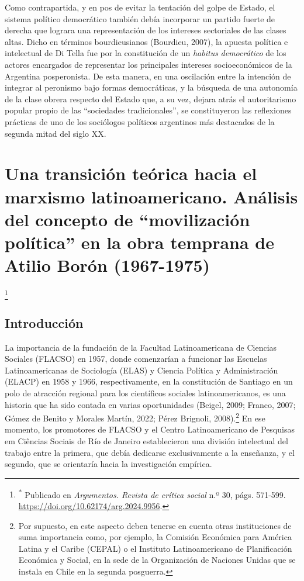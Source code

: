 Como contrapartida, y en pos de evitar la tentación del golpe de Estado, el sistema político democrático también debía incorporar un partido fuerte de derecha que lograra una representación de los intereses sectoriales de las clases altas. Dicho en términos bourdieusianos (Bourdieu, 2007), la apuesta política e intelectual de Di Tella fue por la constitución de un \emph{habitus} \emph{democrático} de los actores encargados de representar los principales intereses socioeconómicos de la Argentina posperonista. De esta manera, en una oscilación entre la intención de integrar al peronismo bajo formas democráticas, y la búsqueda de una autonomía de la clase obrera respecto del Estado que, a su vez, dejara atrás el autoritarismo popular propio de las ``sociedades tradicionales'', se constituyeron las reflexiones prácticas de uno de los sociólogos políticos argentinos más destacados de la segunda mitad del siglo XX.

\chapter{Una transición teórica hacia el marxismo latinoamericano. Análisis del concepto de ``movilización política'' en la obra temprana de Atilio Borón (1967-1975)}

\footnote{\textsuperscript{*} Publicado en \emph{Argumentos. Revista de crítica social} n.º 30, págs. 571-599. \url{https://doi.org/10.62174/arg.2024.9956}.}

\section{Introducción}

La importancia de la fundación de la Facultad Latinoamericana de Ciencias Sociales (FLACSO) en 1957, donde comenzarían a funcionar las Escuelas Latinoamericanas de Sociología (ELAS) y Ciencia Política y Administración (ELACP) en 1958 y 1966, respectivamente, en la constitución de Santiago en un polo de atracción regional para los científicos sociales latinoamericanos, es una historia que ha sido contada en varias oportunidades (Beigel, 2009; Franco, 2007; Gómez de Benito y Morales Martín, 2022; Pérez Brignoli, 2008).\footnote{Por supuesto, en este aspecto deben tenerse en cuenta otras instituciones de suma importancia como, por ejemplo, la Comisión Económica para América Latina y el Caribe (CEPAL) o el Instituto Latinoamericano de Planificación Económica y Social, en la sede de la Organización de Naciones Unidas que se instala en Chile en la segunda posguerra.} En ese momento, los promotores de FLACSO y el Centro Latinoamericano de Pesquisas em Ciências Sociais de Río de Janeiro establecieron una división intelectual del trabajo entre la primera, que debía dedicarse exclusivamente a la enseñanza, y el segundo, que se orientaría hacia la investigación empírica.

